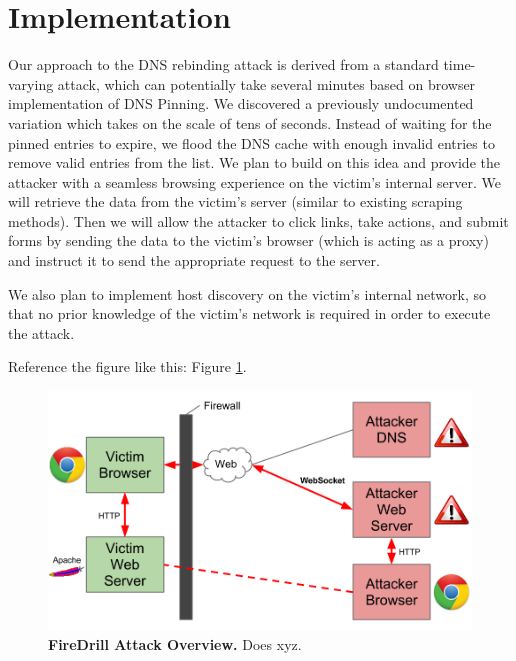 \section{Implementation}
\label{sec:impl}

Our approach to the DNS rebinding attack is derived from a standard time-varying attack, which can potentially take several minutes based on browser implementation of DNS Pinning. We discovered a previously undocumented variation which takes on the scale of tens of seconds. Instead of waiting for the pinned entries to expire, we flood the DNS cache with enough invalid entries to remove valid entries from the list. We plan to build on this idea and provide the attacker with a seamless browsing experience on the victim's internal server. We will retrieve the data from the victim's server (similar to existing scraping methods). Then we will allow the attacker to click links, take actions, and submit forms by sending the data to the victim's browser (which is acting as a proxy) and instruct it to send the appropriate request to the server.

We also plan to implement host discovery on the victim's internal network, so that no prior knowledge of the victim's network is required in order to execute the attack.

Reference the figure like this: Figure \ref{fig:firedrill1}.

\begin{figure}[h]
\centering
\includegraphics[width=0.8\columnwidth]{firedrill1.png}
\caption{\textbf{FireDrill Attack Overview.} Does xyz.}
\label{fig:firedrill1}
\end{figure}


